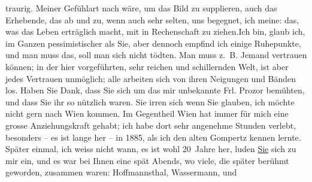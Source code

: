 \begin{ledgroupsized}[t]{13cm}
                    traurig. Meiner Gefühlart nach wäre, um das Bild zu supplieren, auch das
                    Erhebende, das ab und zu, wenn auch sehr selten, uns begegnet, ich meine: das,
                    was das Leben erträglich macht,  mit in
                    Rechenschaft zu ziehen.\hspace*{2em}Ich bin, glaub ich, im
                    Ganzen pessimistischer als Sie, aber dennoch empfind ich einige Ruhepunkte, und
                    man muss das, soll man sich nicht tödten. Man muss z. B. Jemand vertrauen
                    können; {\pb}in der hier
                    vorgeführten, sehr reichen und schillernden Welt, ist aber jedes Vertrauen
                    unmöglich; alle arbeiten sich von ihren Neigungen und Bänden los.\pend
           \pstart
           Haben Sie Dank, dass Sie sich um das mir unbekannte Frl. Prozor bemühten, und dass Sie ihr so nützlich waren.\pend
           \pstart
           Sie irren sich wenn Sie glauben, ich möchte nicht gern nach Wien kommen. Im Gegentheil Wien hat immer für mich eine grosse Anziehungskraft gehabt; ich habe
                    dort sehr angenehme Stunden verlebt, besonders – es ist lange her – in
                        1885, als ich den alten Gompertz kennen lernte. Später einmal, ich weiss nicht wann, es ist
                    wohl 20 Jahre her, luden \uline{Sie} sich zu mir ein,
                    und es war bei Ihnen eine \label{K_L02040_1v}\label{K_L02040_1h} spät Abends, wo viele, die später berühmt \strikeout{\textcolor{gray}{×}\-\textcolor{gray}{×}\-\textcolor{gray}{×}} geworden, zusammen waren: Hoffmannsthal, Wassermann, und

\end{ledgroupsized}
